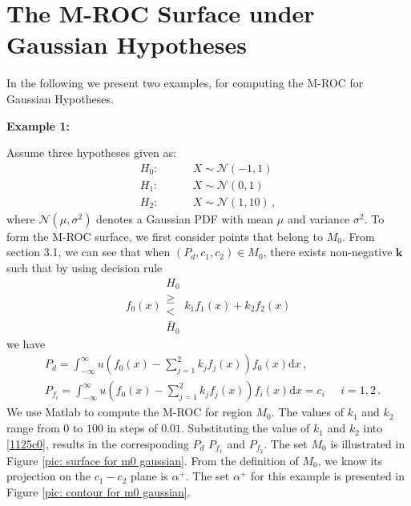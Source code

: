 \section{The M-ROC Surface  under Gaussian Hypotheses}
In the following we present two examples, for computing the M-ROC for Gaussian Hypotheses. 

\noindent \textbf{Example 1:}

Assume three hypotheses given as:
\begin{equation}
\label{equ: Gaussian Hypothesis}
\begin{split}
	H_0:\;\;\;\;\;\;\;\;&X \sim \mathcal{N}(-1,1)\\
    H_1:\;\;\;\;\;\;\;\;&X \sim \mathcal{N}(0,1)\\
    H_2:\;\;\;\;\;\;\;\;&X \sim \mathcal{N}(1,10)\,,
\end{split}
\end{equation}
where $\mathcal{N}(\mu,\sigma^2)$ denotes a Gaussian PDF with mean $\mu$ and variance $\sigma^2$.
To form the M-ROC surface, we first consider points that belong to $M_0$.
From section 3.1, we can see that when $(P_d, c_1, c_2) \in M_0$, there exists non-negative $\mathbf{k}$ such that by using decision rule 
\begin{equation}
f_0(x) \substack{H_0 \\ \geq \\ < \\ \bar{H}_0} k_1f_1(x) + k_2f_2(x)
\end{equation}
we have 
\begin{equation}
\begin{split}
\label{1125c0}
&P_d = \int_{-\infty}^{\infty} u(f_0(x) - \sum_{j=1}^{2}k_jf_j(x)) f_0(x)\mathrm{d}x    \,, \\
&P_{f_i} = \int_{-\infty}^{\infty} u(f_0(x) - \sum_{j=1}^{2}k_jf_j(x)) f_i(x) \mathrm{d}x = c_i\;\;\;\;\;    i=1, 2\,.
\end{split}
\end{equation}
We use Matlab to compute the M-ROC for region $M_0$. The values of $k_1$ and $k_2$ range from $0$ to $100$ in steps of $0.01$. Substituting the value of $k_1$ and $k_2$ into \eqref{1125c0}, results in the corresponding $P_d$ $P_{f_1}$ and $P_{f_2}$.  The set $M_0$ is illustrated in Figure \ref{pic: surface for m0 gaussian}. 
From the definition of $M_0$, we know its projection on the $c_1-c_2$ plane is $\alpha^+$.  
 The set $\alpha^+$ for this example is presented in Figure \ref{pic: contour for m0 gaussian}. 

